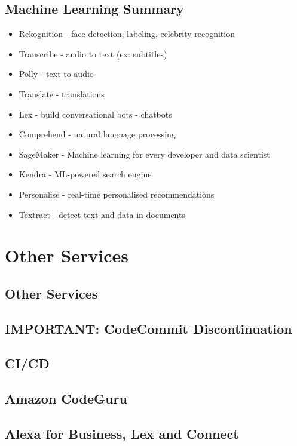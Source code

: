 \documentclass[11pt]{book}
\begin{document}
    \section{Machine Learning Summary}

    \begin{itemize}
        \item Rekognition - face detection, labeling, celebrity recognition
        \item Transcribe - audio to text (ex: subtitles)
        \item Polly - text to audio
        \item Translate - translations
        \item Lex - build conversational bots - chatbots
        \item Comprehend - natural language processing
        \item SageMaker - Machine learning for every developer and data scientist
        \item Kendra - ML-powered search engine
        \item Personalise - real-time personalised recommendations
        \item Textract - detect text and data in documents
    \end{itemize}


    \chapter{Other Services}


    \section{Other Services}


    \section{IMPORTANT: CodeCommit Discontinuation}


    \section{CI/CD}


    \section{Amazon CodeGuru}


    \section{Alexa for Business, Lex and Connect}
\end{document}
